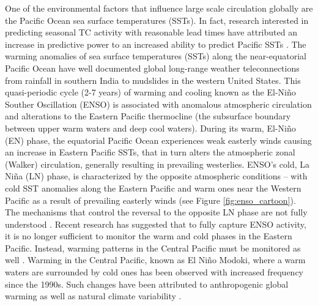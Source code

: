 \documentclass[]{article}
\begin{document}
One of the environmental factors that influence large scale circulation globally are the Pacific Ocean sea surface temperatures (SSTs). In fact, research interested in predicting seasonal TC activity with reasonable lead times have attributed an increase in predictive power to an increased ability to predict Pacific SSTs \cite{smith2010}. The warming anomalies of sea surface temperatures (SSTs) along the near-equatorial Pacific Ocean have well documented global long-range weather teleconnections from rainfall in southern India to mudslides in the western United States. This quasi-periodic cycle (2-7 years) of warming and cooling known as the El-Ni\~no Souther Oscillation (ENSO) is associated with anomalous atmospheric circulation and alterations to the Eastern Pacific thermocline (the subsurface boundary between upper warm waters and deep cool waters). During its warm, El-Ni\~no (EN) phase, the equatorial Pacific Ocean experiences weak easterly winds causing an increase in Eastern Pacific SSTs, that in turn alters the atmospheric zonal (Walker) circulation, generally resulting in prevailing westerlies. ENSO's cold, La Ni\~na (LN) phase, is characterized by the opposite atmospheric conditions -- with cold SST anomalies along the Eastern Pacific and warm ones near the Western Pacific as a result of prevailing easterly winds (see Figure \ref{fig:enso_cartoon}). The mechanisms that control the reversal to the opposite LN phase are not fully understood \cite{kirtman1997,smith2012}. Recent research has suggested that to fully capture ENSO activity, it is no longer sufficient to monitor the warm and cold phases in the Eastern Pacific. Instead, warming patterns in the Central Pacific must be monitored as well \cite{ashok2007}. Warming in the Central Pacific, known as El Ni\~no Modoki, where a warm waters are surrounded by cold ones has been observed with increased frequency since the 1990s. Such changes have been attributed to anthropogenic global warming \cite{yeh2009} as well as natural climate variability \cite{wittenberg2009}.
\end{document}
